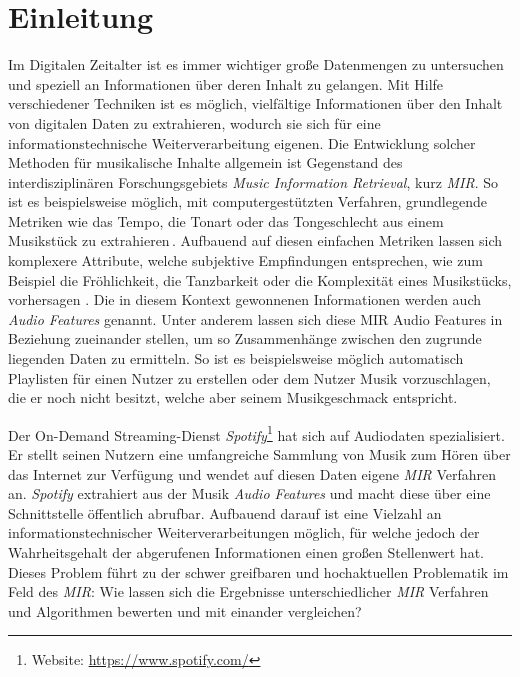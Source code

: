 \section*{Einleitung}
\label{sec:Einleitung}

Im Digitalen Zeitalter ist es immer wichtiger große Datenmengen zu untersuchen und speziell an Informationen über deren Inhalt zu gelangen.
Mit Hilfe verschiedener Techniken ist es möglich, vielfältige Informationen über den Inhalt von digitalen Daten zu extrahieren, wodurch sie sich für eine informationstechnische Weiterverarbeitung eigenen.
Die Entwicklung solcher Methoden für musikalische Inhalte allgemein ist Gegenstand des interdisziplinären Forschungsgebiets \textit{Music Information Retrieval}, kurz \textit{MIR}.
So ist es beispielsweise möglich, mit computergestützten Verfahren, grundlegende Metriken wie das Tempo, die Tonart oder das Tongeschlecht aus einem Musikstück zu extrahieren\,\cite{Casey2008}.
Aufbauend auf diesen einfachen Metriken lassen sich komplexere Attribute, welche subjektive Empfindungen entsprechen, wie zum Beispiel die Fröhlichkeit, die Tanzbarkeit oder die Komplexität eines Musikstücks, vorhersagen \cite{Sturm2013}.
Die in diesem Kontext gewonnenen Informationen werden auch \textit{Audio Features} genannt.
Unter anderem lassen sich diese MIR Audio Features in Beziehung zueinander stellen, um so Zusammenhänge zwischen den zugrunde liegenden Daten zu ermitteln.
So ist es beispielsweise möglich automatisch Playlisten für einen Nutzer zu erstellen oder dem Nutzer Musik vorzuschlagen, die er noch nicht besitzt, welche aber seinem Musikgeschmack entspricht.

Der On-Demand Streaming-Dienst \textit{Spotify}\footnote{Website: \url{https://www.spotify.com/}} hat sich auf Audiodaten spezialisiert.
Er stellt seinen Nutzern eine umfangreiche Sammlung von Musik zum Hören über das Internet zur Verfügung und wendet auf diesen Daten eigene \textit{MIR} Verfahren an.
\textit{Spotify} extrahiert aus der Musik \textit{Audio Features} und macht diese über eine Schnittstelle öffentlich abrufbar.
Aufbauend darauf ist eine Vielzahl an informationstechnischer Weiterverarbeitungen möglich, für welche jedoch der Wahrheitsgehalt der abgerufenen Informationen einen großen Stellenwert hat.
Dieses Problem führt zu der schwer greifbaren und hochaktuellen Problematik im Feld des \textit{MIR}:
Wie lassen sich die Ergebnisse unterschiedlicher \textit{MIR} Verfahren und Algorithmen bewerten und mit einander vergleichen? \cite{Urbano_2013}

